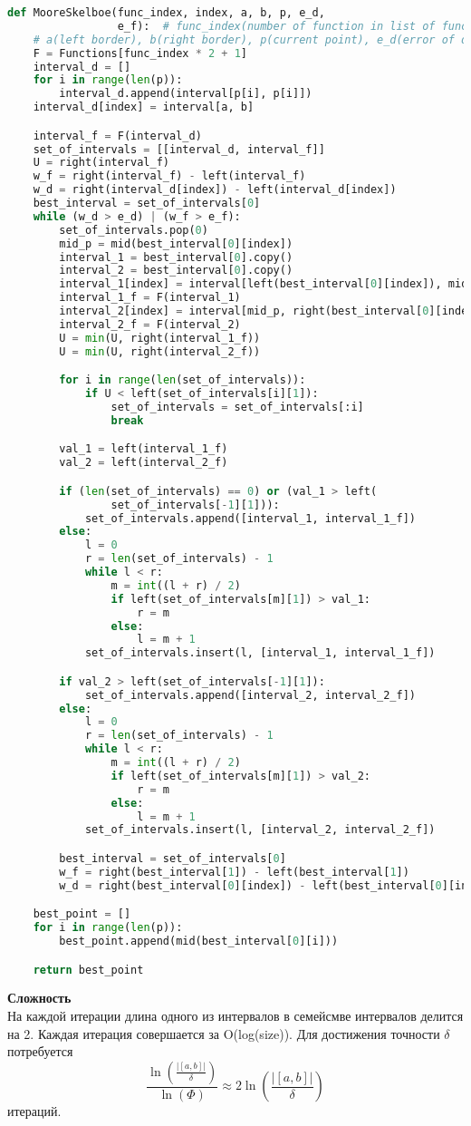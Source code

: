 \begin{lstlisting}[language=Python]
def MooreSkelboe(func_index, index, a, b, p, e_d,
                 e_f):  # func_index(number of function in list of functions), index(index of direction),
    # a(left border), b(right border), p(current point), e_d(error of d), e_f(error of f)
    F = Functions[func_index * 2 + 1]
    interval_d = []
    for i in range(len(p)):
        interval_d.append(interval[p[i], p[i]])
    interval_d[index] = interval[a, b]

    interval_f = F(interval_d)
    set_of_intervals = [[interval_d, interval_f]]
    U = right(interval_f)
    w_f = right(interval_f) - left(interval_f)
    w_d = right(interval_d[index]) - left(interval_d[index])
    best_interval = set_of_intervals[0]
    while (w_d > e_d) | (w_f > e_f):
        set_of_intervals.pop(0)
        mid_p = mid(best_interval[0][index])
        interval_1 = best_interval[0].copy()
        interval_2 = best_interval[0].copy()
        interval_1[index] = interval[left(best_interval[0][index]), mid_p]
        interval_1_f = F(interval_1)
        interval_2[index] = interval[mid_p, right(best_interval[0][index])]
        interval_2_f = F(interval_2)
        U = min(U, right(interval_1_f))
        U = min(U, right(interval_2_f))

        for i in range(len(set_of_intervals)):
            if U < left(set_of_intervals[i][1]):
                set_of_intervals = set_of_intervals[:i]
                break

        val_1 = left(interval_1_f)
        val_2 = left(interval_2_f)

        if (len(set_of_intervals) == 0) or (val_1 > left(
                set_of_intervals[-1][1])):
            set_of_intervals.append([interval_1, interval_1_f])
        else:
            l = 0
            r = len(set_of_intervals) - 1
            while l < r:
                m = int((l + r) / 2)
                if left(set_of_intervals[m][1]) > val_1:
                    r = m
                else:
                    l = m + 1
            set_of_intervals.insert(l, [interval_1, interval_1_f])

        if val_2 > left(set_of_intervals[-1][1]):
            set_of_intervals.append([interval_2, interval_2_f])
        else:
            l = 0
            r = len(set_of_intervals) - 1
            while l < r:
                m = int((l + r) / 2)
                if left(set_of_intervals[m][1]) > val_2:
                    r = m
                else:
                    l = m + 1
            set_of_intervals.insert(l, [interval_2, interval_2_f])

        best_interval = set_of_intervals[0]
        w_f = right(best_interval[1]) - left(best_interval[1])
        w_d = right(best_interval[0][index]) - left(best_interval[0][index])

    best_point = []
    for i in range(len(p)):
        best_point.append(mid(best_interval[0][i]))

    return best_point
\end{lstlisting}


\textbf{Сложность}\\

На каждой итерации длина одного из интервалов в семейсмве интервалов делится на 2. Каждая итерация совершается за O(log(size)).
Для достижения точности $\delta$ потребуется $$\frac{\ln(\frac{|[a, b]|}{\delta})}{\ln(\Phi)} \approx 2\ln(\frac{|[a, b]|}{\delta})$$ итераций.